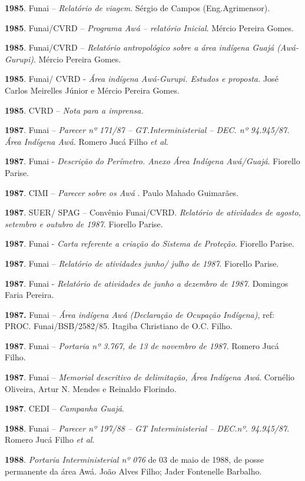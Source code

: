 \textbf{1985}. Funai -- \emph{Relatório de viagem}. Sérgio de Campos
(Eng.Agrimensor).

\textbf{1985}. Funai/CVRD -- \emph{Programa Awá -- relatório Inicial}.
Mércio Pereira Gomes.

\textbf{1985}. Funai/CVRD -- \emph{Relatório antropológico sobre a área
indígena Guajá (Awá-Gurupi)}. Mércio Pereira Gomes.

\textbf{1985}. Funai/ CVRD - \emph{Área indígena Awá-Gurupi. Estudos e
proposta.} José Carlos Meirelles Júnior e Mércio Pereira Gomes.

\textbf{1985}. CVRD -- \emph{Nota para a imprensa.}

\textbf{1987}. Funai -- \emph{Parecer nº 171/87 -- GT.Interministerial
-- DEC. nº 94.945/87. Área Indígena Awá.} Romero Jucá Filho \emph{et
al}.

\textbf{1987}. Funai - \emph{Descrição do Perímetro. Anexo Área Indígena
Awá/Guajá}. Fiorello Parise.

\textbf{1987}. CIMI -- \emph{Parecer sobre os Awá} . Paulo Mahado
Guimarães.

\textbf{1987}. SUER/ SPAG -- Convênio Funai/CVRD. \emph{Relatório de
atividades de agosto, setembro e outubro de 1987}. Fiorello Parise.

\textbf{1987}. Funai - \emph{Carta referente a criação do Sistema de
Proteção}. Fiorello Parise.

\textbf{1987}. Funai -- \emph{Relatório de atividades junho/ julho de
1987}. Fiorello Parise.

\textbf{1987}. Funai - \emph{Relatório de atividades de junho a dezembro
de 1987}. Domingos Faria Pereira.

\textbf{1987.} Funai -- \emph{Área indígena Awá (Declaração de Ocupação
Indígena)}, ref: PROC. Funai/BSB/2582/85. Itagiba Christiano de O.C.
Filho.

\textbf{1987}. Funai -- \emph{Portaria nº 3.767, de 13 de novembro de
1987.} Romero Jucá Filho.

\textbf{1987}. Funai -- \emph{Memorial descritivo de delimitação, Área
Indígena Awá}. Cornélio Oliveira, Artur N. Mendes e Reinaldo Florindo.

\textbf{1987}. CEDI -- \emph{Campanha Guajá}.

\textbf{1988}. Funai -- \emph{Parecer nº 197/88 -- GT Interministerial
-- DEC.nº. 94.945/87}. Romero Jucá Filho \emph{et al}.

\textbf{1988}. \emph{Portaria Interministerial nº 076} de 03 de maio de
1988, de posse permanente da área Awá. João Alves Filho; Jader
Fontenelle Barbalho.

